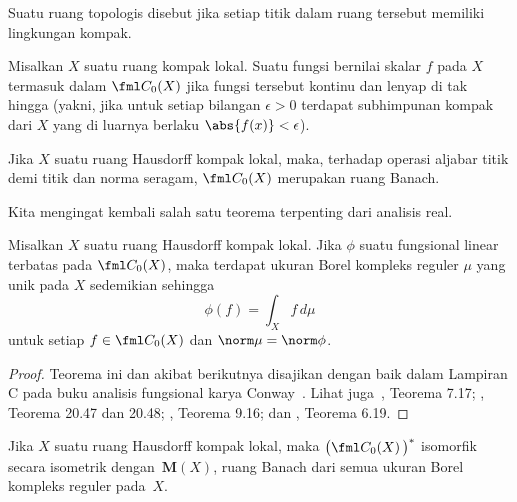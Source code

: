 \begin{defn} Suatu ruang topologis disebut
 jika setiap titik dalam ruang tersebut memiliki lingkungan kompak.
\end{defn}

\begin{notn} Misalkan $X$ suatu ruang kompak lokal. Suatu fungsi bernilai skalar $f$ pada $X$ termasuk dalam $\fml C_0(X)$ jika
fungsi tersebut kontinu dan lenyap di tak hingga (yakni, jika untuk setiap bilangan $\epsilon > 0$ terdapat subhimpunan kompak
dari $X$ yang di luarnya berlaku $\abs{f(x)} < \epsilon$).
\end{notn}

\begin{exam}\label{exam_C0X} Jika $X$ suatu ruang Hausdorff kompak lokal, maka, terhadap operasi aljabar titik demi titik dan norma seragam,
$\fml C_0(X)$ merupakan ruang Banach.
\end{exam}

Kita mengingat kembali salah satu teorema terpenting dari analisis real.

\begin{thm}\label{C057951} Misalkan $X$ suatu ruang Hausdorff kompak lokal.
Jika $\phi$ suatu fungsional linear terbatas pada $\fml C_0(X)$, maka terdapat ukuran Borel kompleks reguler
$\mu$ yang unik pada $X$ sedemikian sehingga
  \[ \phi(f) = \int_X f\,d\mu \]
untuk setiap $f \in \fml C_0(X)$ dan $\norm\mu = \norm\phi$.
\end{thm}

\begin{proof} Teorema ini dan akibat berikutnya disajikan dengan baik dalam Lampiran C pada buku analisis
fungsional karya Conway~\cite{Conway:1990}. Lihat juga~\cite{Folland:1984}, Teorema 7.17; \cite{HewittS:1965},
Teorema 20.47 dan 20.48; \cite{McDonaldW:1999}, Teorema 9.16; dan \cite{Rudin:1987}, Teorema 6.19.  \ns
\end{proof}

\begin{cor}\label{C057952} Jika $X$ suatu ruang Hausdorff kompak lokal, maka $\bigl(\fml C_0(X)\,\bigr)^*$
isomorfik secara isometrik dengan~$\textbf{M}(X)$,
ruang Banach dari semua ukuran Borel kompleks reguler pada~$X$.
\end{cor}

